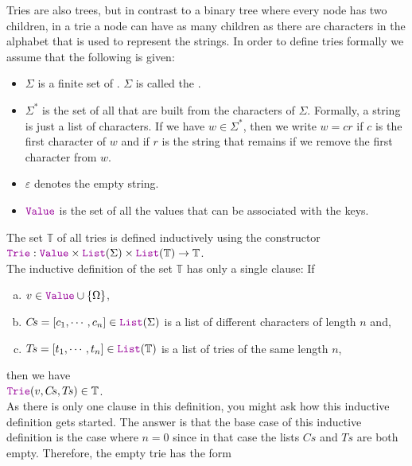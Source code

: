 Tries are also trees, but in contrast to a binary tree where every node has two children, in a trie a
node can have as many children as there are characters in the alphabet that is used to represent the
strings.  In order to define tries formally we assume that the following is given:
\begin{itemize}
\item $\Sigma$ is a finite set of . $\Sigma$ is called the
      . 
\item $\Sigma^*$ is the set of all  that are built from the characters of $\Sigma$.
      Formally, a string is just a list of characters.  If we have $w \in \Sigma^*$, then we write $w = cr$
      if $c$ is the first character of $w$ and if $r$ is the string that remains if we remove the first
      character from $w$.
\item $\varepsilon$ denotes the empty string.
\item $\mytt{Value}$ is the set of all the values that can be associated with the keys.  
\end{itemize}
The set $\mathbb{T}$ of all tries  is defined inductively using the constructor \\[0.2cm]
\hspace*{1.3cm} 
$\mytt{Trie}: \mytt{Value} \times \mytt{List}(\Sigma) \times
\mytt{List}(\mathbb{T}) \rightarrow \mathbb{T}$. 
\\[0.2cm]
The inductive definition of the set $\mathbb{T}$  has only a single clause: If
\begin{enumerate}[(a)]
\item $v \in \mytt{Value} \cup \{\Omega\}$,
\item $C\!s = [c_1, \cdots, c_n] \in \mytt{List}(\Sigma)$ is a list of different characters of length
      $n$ and,
\item $T\!s = [t_1, \cdots, t_n] \in \mytt{List}(\mathbb{T})$ is a list of  tries of the same length $n$, 
\end{enumerate}
then we have 
\\[0.2cm]
\hspace*{1.3cm}  $\mytt{Trie}(v, C\!s, T\!s) \in \mathbb{T}$.  
\\[0.2cm]
As there is only one clause in this definition, you might ask how this inductive definition gets started.
The answer is that the base case of this inductive definition is the case where
$n=0$ since in that case the lists  $C\!s$ and $T\!s$ are both empty.  Therefore, the empty trie has the form
